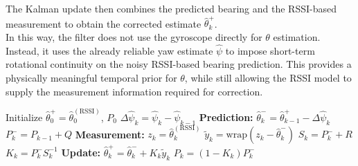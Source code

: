 \documentclass[subscriptcorrection,upint,varvw,barcolor=Goldenrod3,mathalfa=cal=euler,balance,hyphenate,pdf-a]{asmejour}
\begin{document}
The Kalman update then combines the predicted bearing and the RSSI-based measurement to obtain the corrected estimate \(\hat{\theta}_k^{+}\).\\
In this way, the filter does not use the gyroscope directly for \(\theta\) estimation. Instead, it uses the already reliable yaw estimate \(\hat{\psi}\) to impose short-term rotational continuity on the noisy RSSI-based bearing prediction. This provides a physically meaningful temporal prior for \(\theta\), while still allowing the RSSI model to supply the measurement information required for correction.
\begin{algorithm}[!t]
\caption{$\psi$-Guided Kalman Correction of $\theta$}
\begin{algorithmic}[1]
\State Initialize $\hat{\theta}_0^{+} = \hat{\theta}_0^{(\mathrm{RSSI})}$, $P_0$
    \State $\Delta \hat{\psi}_k = \hat{\psi}_k - \hat{\psi}_{k-1}$
    \State \textbf{Prediction:} $\hat{\theta}_k^{-} = \hat{\theta}_{k-1}^{+} - \Delta \hat{\psi}_k$
    \State $P_k^{-} = P_{k-1} + Q$
    \State \textbf{Measurement:} $z_k = \hat{\theta}_k^{(\mathrm{RSSI})}$
    \State $\tilde{y}_k = \mathrm{wrap}(z_k - \hat{\theta}_k^{-})$
    \State $S_k = P_k^{-} + R$
    \State $K_k = P_k^{-} S_k^{-1}$
    \State \textbf{Update:} $\hat{\theta}_k^{+} = \hat{\theta}_k^{-} + K_k \tilde{y}_k$
    \State $P_k = (1 - K_k) P_k^{-}$
\EndFor
\end{algorithmic}
\end{algorithm}

\end{document}
